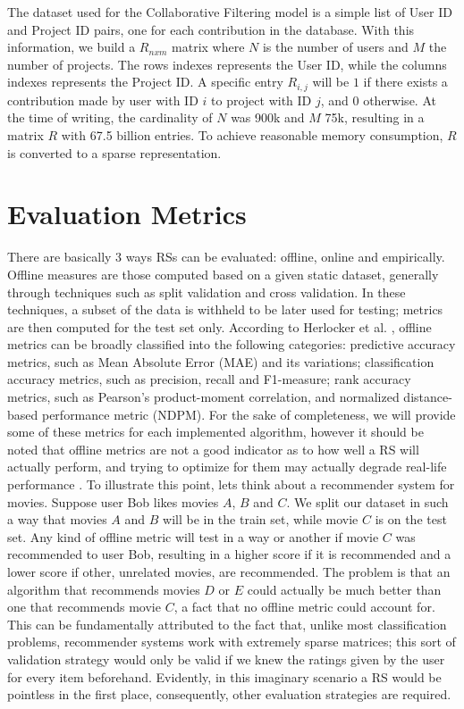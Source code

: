 \documentclass[cic,tc,english]{iiufrgs}
\begin{document}
The dataset used for the Collaborative Filtering model is a simple list of User ID and Project ID pairs, one for each contribution in the database. With this information, we build a \(R_{nxm}\) matrix where $N$ is the number of users and $M$ the number of projects. The rows indexes represents the User ID, while the columns indexes represents the Project ID. A specific entry $R_{i,j}$ will be $1$ if there exists a contribution made by user with ID $i$ to project with ID $j$, and $0$ otherwise. At the time of writing, the cardinality of $N$ was 900k and $M$ 75k, resulting in a matrix $R$ with 67.5 billion entries. To achieve reasonable memory consumption, $R$ is converted to a sparse representation.

\section{Evaluation Metrics}
There are basically 3 ways RSs can be evaluated: offline, online and empirically. Offline measures are those computed based on a given static dataset, generally through techniques such as split validation and cross validation. In these techniques, a subset of the data is withheld to be later used for testing; metrics are then computed for the test set only. According to Herlocker et al. \cite{Herlocker2004}, offline metrics can be broadly classified into the following categories: predictive accuracy metrics, such as Mean Absolute Error (MAE) and its variations; classification accuracy metrics, such as precision, recall and F1-measure; rank accuracy metrics, such as Pearson’s product-moment correlation, and normalized distance-based performance metric (NDPM). For the sake of completeness, we will provide some of these metrics for each implemented algorithm, however it should be noted that offline metrics are not a good indicator as to how well a RS will actually perform, and trying to optimize for them may actually degrade real-life performance \cite{McNee2006}. To illustrate this point, lets think about a recommender system for movies. Suppose user Bob likes movies $A$, $B$ and $C$. We split our dataset in such a way that movies $A$ and $B$ will be in the train set, while movie $C$ is on the test set. Any kind of offline metric will test in a way or another if movie $C$ was recommended to user Bob, resulting in a higher score if it is recommended and a lower score if other, unrelated movies, are recommended. The problem is that an algorithm that recommends movies $D$ or $E$ could actually be much better than one that recommends movie $C$, a fact that no offline metric could account for. This can be fundamentally attributed to the fact that, unlike most classification problems, recommender systems work with extremely sparse matrices; this sort of validation strategy would only be valid if we knew the ratings given by the user for every item beforehand. Evidently, in this imaginary scenario a RS would be pointless in the first place, consequently, other evaluation strategies are required.
\end{document}
